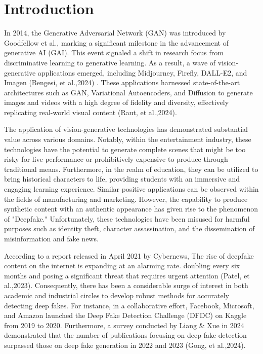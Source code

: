 \documentclass{svproc}
\begin{document}
\section{Introduction}
In 2014, the Generative Adversarial Network (GAN) was introduced by Goodfellow et al., marking a significant milestone in the advancement of generative AI (GAI). This event signaled a shift in research focus from discriminative learning to generative learning. As a result, a wave of vision-generative applications emerged, including Midjourney, Firefly, DALL-E2, and Imagen (Bengesi, et al.,2024) \cite{bengesi2024advancements}. These applications harnessed state-of-the-art architectures such as GAN, Variational Autoencoders, and Diffusion to generate images and videos with a high degree of fidelity and diversity, effectively replicating real-world visual content (Raut, et al.,2024)\cite{raut2024generative}.

The application of vision-generative technologies has demonstrated substantial value across various domains. Notably, within the entertainment industry, these technologies have the potential to generate complete scenes that might be too risky for live performance or prohibitively expensive to produce through traditional means. Furthermore, in the realm of education, they can be utilized to bring historical characters to life, providing students with an immersive and engaging learning experience. Similar positive applications can be observed within the fields of manufacturing and marketing. However, the capability to produce synthetic content with an authentic appearance has given rise to the phenomenon of "Deepfake." Unfortunately, these technologies have been misused for harmful purposes such as identity theft, character assassination, and the dissemination of misinformation and fake news.

According to a report released in April 2021 by Cybernews, The rise of deepfake content on the internet is expanding at an alarming rate. doubling every six months and posing a significant threat that requires urgent attention (Patel, et al.,2023)\cite{patel2023deepfake}. Consequently, there has been a considerable surge of interest in both academic and industrial circles to develop robust methods for accurately detecting deep fakes. For instance, in a collaborative effort, Facebook, Microsoft, and Amazon launched the Deep Fake Detection Challenge (DFDC) on Kaggle from 2019 to 2020. Furthermore, a survey conducted by Liang \& Xue in 2024 demonstrated that the number of publications focusing on deep fake detection surpassed those on deep fake generation in 2022 and 2023 (Gong, et al.,2024)\cite {gong2024contemporary}.
\end{document}
